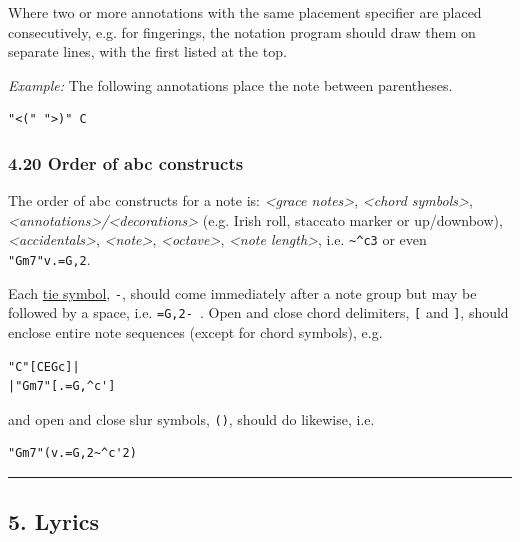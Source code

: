 \documentclass[oneside]{book}
\begin{document}
Where two or more annotations with the same placement specifier are
placed consecutively, e.g. for fingerings, the notation program should
draw them on separate lines, with the first listed at the top.

\emph{Example:} The following annotations place the note between
parentheses.

\begin{verbatim}
"<(" ">)" C
\end{verbatim}

\hypertarget{order_of_abc_constructs}{\subsubsection{4.20 Order of abc
constructs}\label{order_of_abc_constructs}}

The order of abc constructs for a note is: \emph{\textless{}grace
notes\textgreater{}}, \emph{\textless{}chord symbols\textgreater{}},
\emph{\textless{}annotations\textgreater{}/\textless{}decorations\textgreater{}}
(e.g. Irish roll, staccato marker or up/downbow),
\emph{\textless{}accidentals\textgreater{}},
\emph{\textless{}note\textgreater{}},
\emph{\textless{}octave\textgreater{}}, \emph{\textless{}note
length\textgreater{}}, i.e.
\texttt{\textasciitilde{}\^{}c\textquotesingle{}3} or even
\texttt{"Gm7"v.=G,2}.

Each \protect\hyperlink{ties_and_slurs}{tie symbol}, \texttt{-}, should
come immediately after a note group but may be followed by a space, i.e.
\texttt{=G,2-\ }. Open and close chord delimiters, \texttt{{[}} and
\texttt{{]}}, should enclose entire note sequences (except for chord
symbols), e.g.

\begin{verbatim}
"C"[CEGc]|
|"Gm7"[.=G,^c']
\end{verbatim}

and open and close slur symbols, \texttt{()}, should do likewise, i.e.

\begin{verbatim}
"Gm7"(v.=G,2~^c'2)
\end{verbatim}

\begin{center}\rule{0.5\linewidth}{\linethickness}\end{center}

\hypertarget{lyrics}{\subsection{5. Lyrics}\label{lyrics}}
\end{document}
